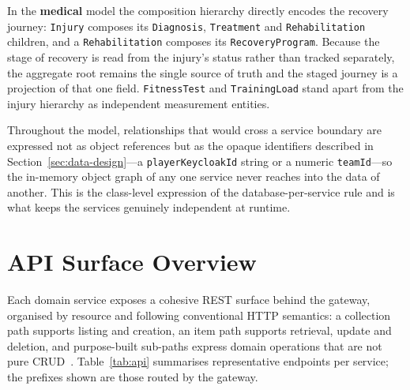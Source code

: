 In the \textbf{medical} model the composition hierarchy directly encodes the recovery
journey: \texttt{Injury} composes its \texttt{Diagnosis}, \texttt{Treatment} and
\texttt{Rehabilitation} children, and a \texttt{Rehabilitation} composes its
\texttt{RecoveryProgram}. Because the stage of recovery is read from the injury's status
rather than tracked separately, the aggregate root remains the single source of truth and
the staged journey is a projection of that one field. \texttt{FitnessTest} and
\texttt{TrainingLoad} stand apart from the injury hierarchy as independent measurement
entities.

Throughout the model, relationships that would cross a service boundary are expressed not
as object references but as the opaque identifiers described in
Section~\ref{sec:data-design}---a \texttt{playerKeycloakId} string or a numeric
\texttt{teamId}---so the in-memory object graph of any one service never reaches into the
data of another. This is the class-level expression of the database-per-service rule and
is what keeps the services genuinely independent at runtime.

\section{API Surface Overview}
\label{sec:api-surface}

Each domain service exposes a cohesive REST surface behind the gateway, organised by
resource and following conventional HTTP semantics: a collection path supports listing
and creation, an item path supports retrieval, update and deletion, and purpose-built
sub-paths express domain operations that are not pure CRUD~\cite{restapi}.
Table~\ref{tab:api} summarises representative endpoints per service; the prefixes shown
are those routed by the gateway.

